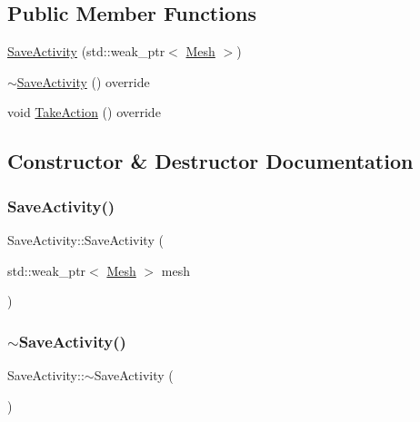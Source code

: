 \subsection*{Public Member Functions}
\begin{DoxyCompactItemize}
\item 
\mbox{\hyperlink{class_save_activity_a3b3a957d6b9a9848946a49297e43f1ac}{Save\+Activity}} (std\+::weak\+\_\+ptr$<$ \mbox{\hyperlink{class_mesh}{Mesh}} $>$)
\item 
\mbox{\hyperlink{class_save_activity_a4182cd966f7fe43e446ddffe134c4e70}{$\sim$\+Save\+Activity}} () override
\item 
void \mbox{\hyperlink{class_save_activity_af8bd3121c8109caedd8f4ae481879f1a}{Take\+Action}} () override
\end{DoxyCompactItemize}


\subsection{Constructor \& Destructor Documentation}
\mbox{\label{class_save_activity_a3b3a957d6b9a9848946a49297e43f1ac}} 
\subsubsection{\texorpdfstring{SaveActivity()}{SaveActivity()}}
{\footnotesize\ttfamily Save\+Activity\+::\+Save\+Activity (\begin{DoxyParamCaption}\item[{std\+::weak\+\_\+ptr$<$ \mbox{\hyperlink{class_mesh}{Mesh}} $>$}]{mesh }\end{DoxyParamCaption})\hspace{0.3cm}{\ttfamily [explicit]}}

\mbox{\label{class_save_activity_a4182cd966f7fe43e446ddffe134c4e70}} 
\subsubsection{\texorpdfstring{$\sim$SaveActivity()}{~SaveActivity()}}
{\footnotesize\ttfamily Save\+Activity\+::$\sim$\+Save\+Activity (\begin{DoxyParamCaption}{ }\end{DoxyParamCaption})\hspace{0.3cm}{\ttfamily [override]}}



